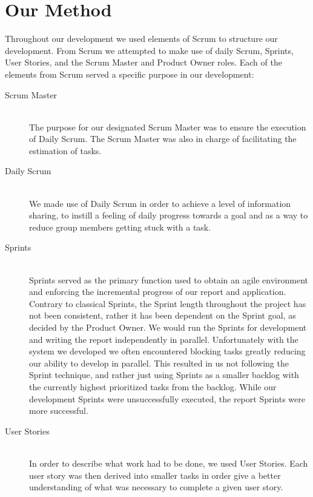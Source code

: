 \section{Our Method}
Throughout our development we used elements of Scrum to structure our development.
From Scrum we attempted to make use of daily Scrum, Sprints, User Stories, and the Scrum Master and Product Owner roles.
Each of the elements from Scrum served a specific purpose in our development:
\begin{description}
    \item [Scrum Master] \hfill \\
        The purpose for our designated Scrum Master was to ensure the execution of Daily Scrum.
        The Scrum Master was also in charge of facilitating the estimation of tasks.
    \item [Daily Scrum] \hfill \\
        We made use of Daily Scrum in order to achieve a level of information sharing, to instill a feeling of daily progress towards a goal and as a way to reduce group members getting stuck with a task.
    \item [Sprints] \hfill \\
        Sprints served as the primary function used to obtain an agile environment and enforcing the incremental progress of our report and application.
        Contrary to classical Sprints, the Sprint length throughout the project has not been consistent, rather it has been dependent on the Sprint goal, as decided by the Product Owner.
        We would run the Sprints for development and writing the report independently in parallel.
        Unfortunately with the system we developed we often encountered blocking tasks greatly reducing our ability to develop in parallel.
        This resulted in us not following the Sprint technique, and rather just using Sprints as a smaller backlog with the currently highest prioritized tasks from the backlog.
        While our development Sprints were unsuccessfully executed, the report Sprints were more successful.
    \item [User Stories] \hfill \\
        In order to describe what work had to be done, we used User Stories.
        Each user story was then derived into smaller tasks in order give a better understanding of what was necessary to complete a given user story.

\end{description}
